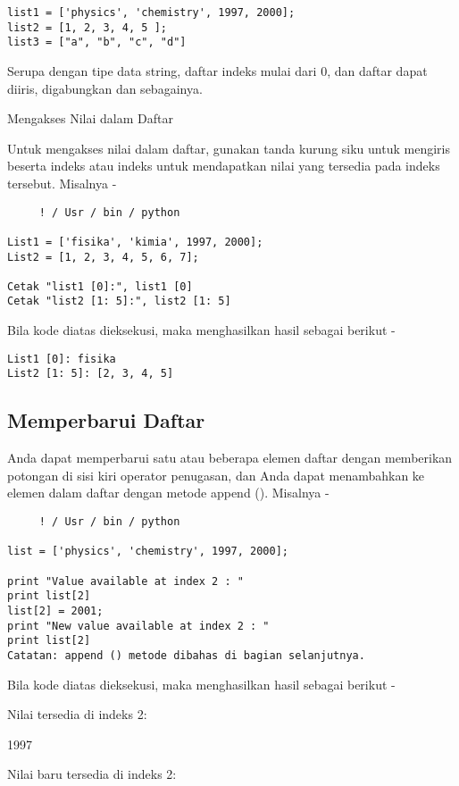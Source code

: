 \begin{verbatim}
list1 = ['physics', 'chemistry', 1997, 2000]; 
list2 = [1, 2, 3, 4, 5 ]; 
list3 = ["a", "b", "c", "d"]
\end{verbatim} 

Serupa dengan tipe data string, daftar indeks mulai dari 0, dan daftar dapat diiris, digabungkan dan sebagainya.
 
Mengakses Nilai dalam Daftar 

Untuk mengakses nilai dalam daftar, gunakan tanda kurung siku untuk mengiris beserta indeks atau indeks untuk mendapatkan nilai yang tersedia pada indeks tersebut. Misalnya - 

\begin{verbatim}
     ! / Usr / bin / python 

List1 = ['fisika', 'kimia', 1997, 2000]; 
List2 = [1, 2, 3, 4, 5, 6, 7]; 

Cetak "list1 [0]:", list1 [0] 
Cetak "list2 [1: 5]:", list2 [1: 5] 
\end{verbatim}

Bila kode diatas dieksekusi, maka menghasilkan hasil sebagai berikut - 

\begin{verbatim}
List1 [0]: fisika 
List2 [1: 5]: [2, 3, 4, 5] 
\end{verbatim}
\subsection{Memperbarui Daftar}

Anda dapat memperbarui satu atau beberapa elemen daftar dengan memberikan potongan di sisi kiri operator penugasan, dan Anda dapat menambahkan ke elemen dalam daftar dengan metode append (). Misalnya - 

\begin{verbatim}
     ! / Usr / bin / python 

list = ['physics', 'chemistry', 1997, 2000]; 

print "Value available at index 2 : " 
print list[2] 
list[2] = 2001; 
print "New value available at index 2 : " 
print list[2] 
Catatan: append () metode dibahas di bagian selanjutnya. 
\end{verbatim}

Bila kode diatas dieksekusi, maka menghasilkan hasil sebagai berikut - 

Nilai tersedia di indeks 2: 

1997 

Nilai baru tersedia di indeks 2: 

